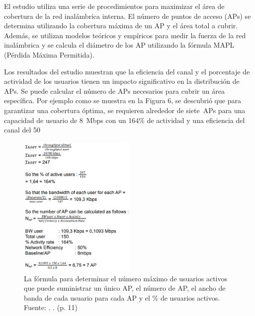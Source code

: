 El estudio utiliza una serie de procedimientos para maximizar el área de cobertura de la red inalámbrica interna. El número de puntos de acceso (APs) se determina utilizando la cobertura máxima de un AP y el área total a cubrir. Además, se utilizan modelos teóricos y empíricos para medir la fuerza de la red inalámbrica y se calcula el diámetro de los AP utilizando la fórmula MAPL (Pérdida Máxima Permitida).

Los resultados del estudio muestran que la eficiencia del canal y el porcentaje de actividad de los usuarios tienen un impacto significativo en la distribución de APs. Se puede calcular el número de APs necesarios para cubrir un área específica. Por ejemplo como se muestra en la Figura 6, se descubrió que para garantizar una cobertura óptima, se requieren alrededor de siete APs para una capacidad de usuario de 8 Mbps con un 164\% de actividad y una eficiencia del canal del 50%

\begin{figure}[!ht]
	\begin{center}
		\includegraphics[width=0.5\textwidth]{2/figures/dudhat2022.png}
		\caption[La fórmula para determinar el número máximo de usuarios activos que puede suministrar un único AP, el número de AP, el ancho de banda de cada usuario para cada AP y el \% de usuarios activos]{La fórmula para determinar el número máximo de usuarios activos que puede suministrar un único AP, el número de AP, el ancho de banda de cada usuario para cada AP y el \% de usuarios activos.\\
			Fuente: \cite{pr_dudhat2022indoorwir}. . (p. 11)}
		\label{2:fig114}
	\end{center}
\end{figure}

